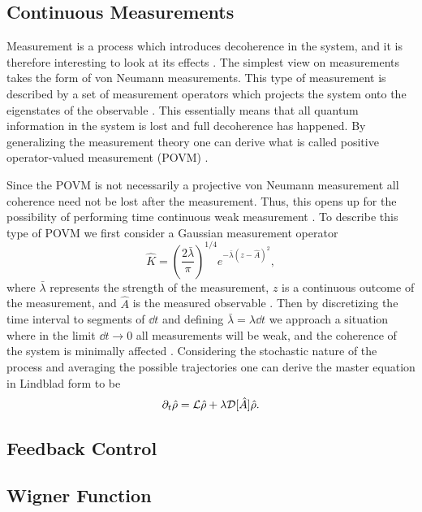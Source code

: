 \subsection{Continuous Measurements}
Measurement is a process which introduces decoherence in the system, and it is therefore interesting to look at its effects \cite{Jordan:2024}. The simplest view on measurements takes the form of von Neumann measurements. This type of measurement is described by a set of measurement operators which projects the system onto the eigenstates of the observable \cite{Annby-Andersson:2024}. This essentially means that all quantum information in the system is lost and full decoherence has happened. By generalizing the measurement theory one can derive what is called positive operator-valued measurement (POVM) \cite{Annby-Andersson:2024}.

Since the POVM is not necessarily a projective von Neumann measurement all coherence need not be lost after the measurement. Thus, this opens up for the possibility of performing time continuous weak measurement \cite{Annby-Andersson:2024}. To describe this type of POVM we first consider a Gaussian measurement operator
\begin{equation}
    \hat{K} = \left(\frac{2 \bar{\lambda}}{\pi}\right)^{1/4} e^{-\bar{\lambda}(z - \hat{A})^2},
\end{equation}
where $\bar{\lambda}$ represents the strength of the measurement, $z$ is a continuous outcome of the measurement, and $\hat{A}$ is the measured observable \cite{Annby-Andersson:2024}. Then by discretizing the time interval to segments of $\dd t$ and defining $\bar{\lambda} = \lambda \dd t$ we approach a situation where in the limit $\dd t \to 0$ all measurements will be weak, and the coherence of the system is minimally affected \cite{Annby-Andersson:2024}. Considering the stochastic nature of the process and averaging the possible trajectories one can derive the master equation \cite{Annby-Andersson:2024} in Lindblad form to be 
\begin{equation}
    \partial_t\hat{\rho} = \mathcal{L}\hat{\rho} + \lambda \mathcal{D}[\hat{A}] \hat{\rho}. \label{eq:masterMeas}
\end{equation}

\subsection{Feedback Control}
\subsection{Wigner Function}
